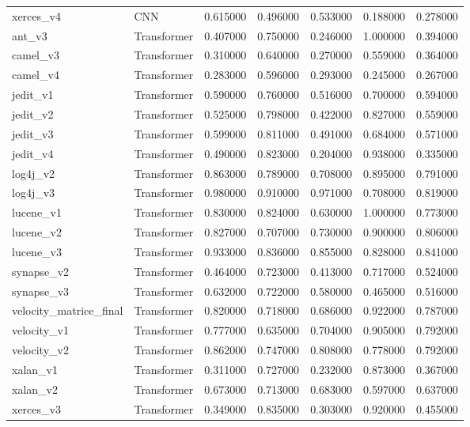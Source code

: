 \begin{table}
\begin{tabular}{llrrrrr}
xerces_v4 & CNN & 0.615000 & 0.496000 & 0.533000 & 0.188000 & 0.278000 \\
ant_v3 & Transformer & 0.407000 & 0.750000 & 0.246000 & 1.000000 & 0.394000 \\
camel_v3 & Transformer & 0.310000 & 0.640000 & 0.270000 & 0.559000 & 0.364000 \\
camel_v4 & Transformer & 0.283000 & 0.596000 & 0.293000 & 0.245000 & 0.267000 \\
jedit_v1 & Transformer & 0.590000 & 0.760000 & 0.516000 & 0.700000 & 0.594000 \\
jedit_v2 & Transformer & 0.525000 & 0.798000 & 0.422000 & 0.827000 & 0.559000 \\
jedit_v3 & Transformer & 0.599000 & 0.811000 & 0.491000 & 0.684000 & 0.571000 \\
jedit_v4 & Transformer & 0.490000 & 0.823000 & 0.204000 & 0.938000 & 0.335000 \\
log4j_v2 & Transformer & 0.863000 & 0.789000 & 0.708000 & 0.895000 & 0.791000 \\
log4j_v3 & Transformer & 0.980000 & 0.910000 & 0.971000 & 0.708000 & 0.819000 \\
lucene_v1 & Transformer & 0.830000 & 0.824000 & 0.630000 & 1.000000 & 0.773000 \\
lucene_v2 & Transformer & 0.827000 & 0.707000 & 0.730000 & 0.900000 & 0.806000 \\
lucene_v3 & Transformer & 0.933000 & 0.836000 & 0.855000 & 0.828000 & 0.841000 \\
synapse_v2 & Transformer & 0.464000 & 0.723000 & 0.413000 & 0.717000 & 0.524000 \\
synapse_v3 & Transformer & 0.632000 & 0.722000 & 0.580000 & 0.465000 & 0.516000 \\
velocity_matrice_final & Transformer & 0.820000 & 0.718000 & 0.686000 & 0.922000 & 0.787000 \\
velocity_v1 & Transformer & 0.777000 & 0.635000 & 0.704000 & 0.905000 & 0.792000 \\
velocity_v2 & Transformer & 0.862000 & 0.747000 & 0.808000 & 0.778000 & 0.792000 \\
xalan_v1 & Transformer & 0.311000 & 0.727000 & 0.232000 & 0.873000 & 0.367000 \\
xalan_v2 & Transformer & 0.673000 & 0.713000 & 0.683000 & 0.597000 & 0.637000 \\
xerces_v3 & Transformer & 0.349000 & 0.835000 & 0.303000 & 0.920000 & 0.455000 \\
\bottomrule
\end{tabular}
\end{table}
